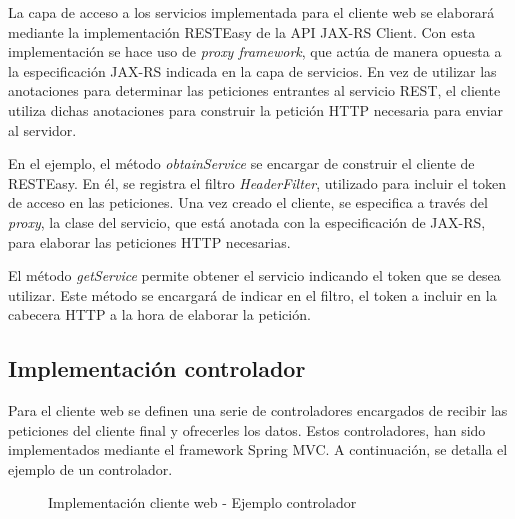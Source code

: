 La capa de acceso a los servicios implementada para el cliente web se elaborará mediante la implementación RESTEasy de la API JAX-RS Client. Con esta implementación se hace uso de \textit{proxy framework}, que actúa de manera opuesta a la especificación JAX-RS indicada en la capa de servicios. En vez de utilizar las anotaciones para determinar las peticiones entrantes al servicio REST, el cliente utiliza dichas anotaciones para construir la petición HTTP necesaria para enviar al servidor.

En el ejemplo, el método \textit{obtainService} se encargar de construir el cliente de RESTEasy. En él, se registra el filtro \textit{HeaderFilter}, utilizado para incluir el token de acceso en las peticiones. Una vez creado el cliente, se especifica a través del \textit{proxy}, la clase del servicio, que está anotada con la especificación de JAX-RS, para elaborar las peticiones HTTP necesarias.

El método \textit{getService} permite obtener el servicio indicando el token que se desea utilizar. Este método se encargará de indicar en el filtro, el token a incluir en la cabecera HTTP a la hora de elaborar la petición.


\subsection{Implementación controlador}
Para el cliente web se definen una serie de controladores encargados de recibir las peticiones del cliente final y ofrecerles los datos. Estos controladores, han sido implementados mediante el framework Spring MVC. A continuación, se detalla el ejemplo de un controlador.

\begin{figure}[H]
\centering
{}
\caption{Implementación cliente web - Ejemplo controlador}
\end{figure}

